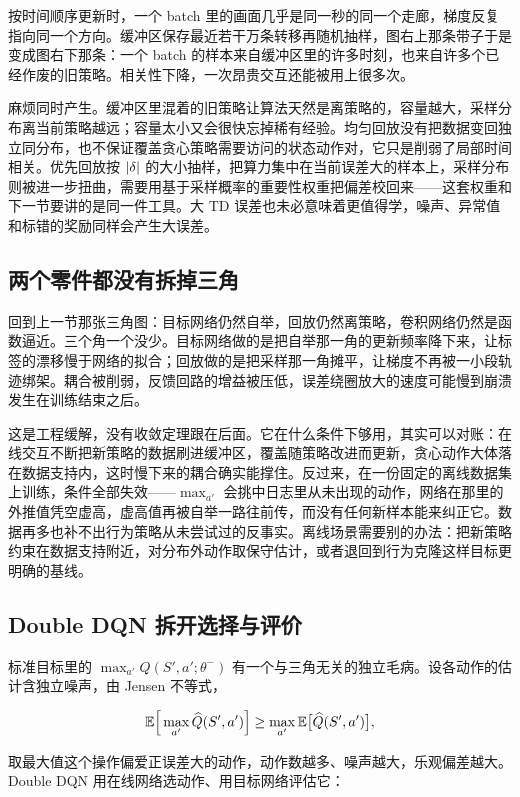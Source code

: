 按时间顺序更新时，一个 batch 里的画面几乎是同一秒的同一个走廊，梯度反复指向同一个方向。缓冲区保存最近若干万条转移再随机抽样，图右上那条带子于是变成图右下那条：一个 batch 的样本来自缓冲区里的许多时刻，也来自许多个已经作废的旧策略。相关性下降，一次昂贵交互还能被用上很多次。

麻烦同时产生。缓冲区里混着的旧策略让算法天然是离策略的，容量越大，采样分布离当前策略越远；容量太小又会很快忘掉稀有经验。均匀回放没有把数据变回独立同分布，也不保证覆盖贪心策略需要访问的状态动作对，它只是削弱了局部时间相关。优先回放按 \(\left|\delta\right|\) 的大小抽样，把算力集中在当前误差大的样本上，采样分布则被进一步扭曲，需要用基于采样概率的重要性权重把偏差校回来——这套权重和下一节要讲的是同一件工具。大 TD 误差也未必意味着更值得学，噪声、异常值和标错的奖励同样会产生大误差。

\subsection{两个零件都没有拆掉三角}

回到上一节那张三角图：目标网络仍然自举，回放仍然离策略，卷积网络仍然是函数逼近。三个角一个没少。目标网络做的是把自举那一角的更新频率降下来，让标签的漂移慢于网络的拟合；回放做的是把采样那一角摊平，让梯度不再被一小段轨迹绑架。耦合被削弱，反馈回路的增益被压低，误差绕圈放大的速度可能慢到崩溃发生在训练结束之后。

这是工程缓解，没有收敛定理跟在后面。它在什么条件下够用，其实可以对账：在线交互不断把新策略的数据刷进缓冲区，覆盖随策略改进而更新，贪心动作大体落在数据支持内，这时慢下来的耦合确实能撑住。反过来，在一份固定的离线数据集上训练，条件全部失效——\(\max_{a'}\) 会挑中日志里从未出现的动作，网络在那里的外推值凭空虚高，虚高值再被自举一路往前传，而没有任何新样本能来纠正它。数据再多也补不出行为策略从未尝试过的反事实。离线场景需要别的办法：把新策略约束在数据支持附近，对分布外动作取保守估计，或者退回到行为克隆这样目标更明确的基线。

\subsection{Double DQN 拆开选择与评价}

标准目标里的 \(\max_{a'}Q(S',a';\theta^-)\) 有一个与三角无关的独立毛病。设各动作的估计含独立噪声，由 Jensen 不等式，

\[
\mathbb{E}\Big[\max_{a'}\widehat Q(S',a')\Big]\ge\max_{a'}\mathbb{E}\big[\widehat Q(S',a')\big],
\]

取最大值这个操作偏爱正误差大的动作，动作数越多、噪声越大，乐观偏差越大。Double DQN 用在线网络选动作、用目标网络评估它：

